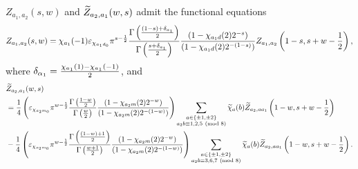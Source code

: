 \documentclass[12pt,reqno,oneside]{amsart}
\begin{document}
    \begin{theorem}\label{thm:double_Dirichlet_series_functional_equation}
        $Z_{a_{1},a_{2}}(s,w)$ and $\widetilde{Z}_{a_{2},a_{1}}(w,s)$ admit the functional equations
        \[
            Z_{a_{1},a_{2}}(s,w) = \chi_{a_{1}}(-1)\varepsilon_{\chi_{a_{1}d_{0}}}\pi^{s-\frac{1}{2}}\frac{\Gamma\left(\frac{(1-s)+\delta_{a_{1}}}{2}\right)}{\Gamma\left(\frac{s+\delta_{a_{1}}}{2}\right)}\frac{(1-\chi_{a_{1}d}(2)2^{-s})}{(1-\chi_{a_{1}d}(2)2^{-(1-s)})}Z_{a_{1},a_{2}}\left(1-s,s+w-\frac{1}{2}\right),
        \]
        where $\delta_{\alpha_{1}} = \frac{\chi_{a_{1}}(1)-\chi_{a_{1}}(-1)}{2}$, and
        \begin{align*}
            &\widetilde{Z}_{a_{2},a_{1}}(w,s) \\
            &= \frac{1}{4}\left(\varepsilon_{\chi_{a_{2}m_{0}}}\pi^{w-\frac{1}{2}}\frac{\Gamma\left(\frac{1-w}{2}\right)}{\Gamma\left(\frac{w}{2}\right)}\frac{(1-\chi_{a_{2}m}(2)2^{-w})}{(1-\chi_{a_{2}m}(2)2^{-(1-w)})}\right)\sum_{\substack{a \in \{\pm1,\pm2\} \\ a_{2}b \equiv 1,2,5 \ \left(\text{mod }8\right)}}\widetilde{\chi}_{a}(b)\widetilde{Z}_{a_{2},aa_{1}}\left(1-w,s+w-\frac{1}{2}\right) \\
            &- \frac{1}{4}\left(\varepsilon_{\chi_{a_{2}m_{0}}}\pi^{w-\frac{1}{2}}\frac{\Gamma\left(\frac{(1-w)+1}{2}\right)}{\Gamma\left(\frac{w+1}{2}\right)}\frac{(1-\chi_{a_{2}m}(2)2^{-w})}{(1-\chi_{a_{2}m}(2)2^{-(1-w)})}\right)\sum_{\substack{a \in \{\pm1,\pm2\} \\ a_{2}b \equiv 3,6,7 \ \left(\text{mod }8\right)}}\widetilde{\chi}_{a}(b)\widetilde{Z}_{a_{2},aa_{1}}\left(1-w,s+w-\frac{1}{2}\right).
        \end{align*}
    \end{theorem}
\end{document}
